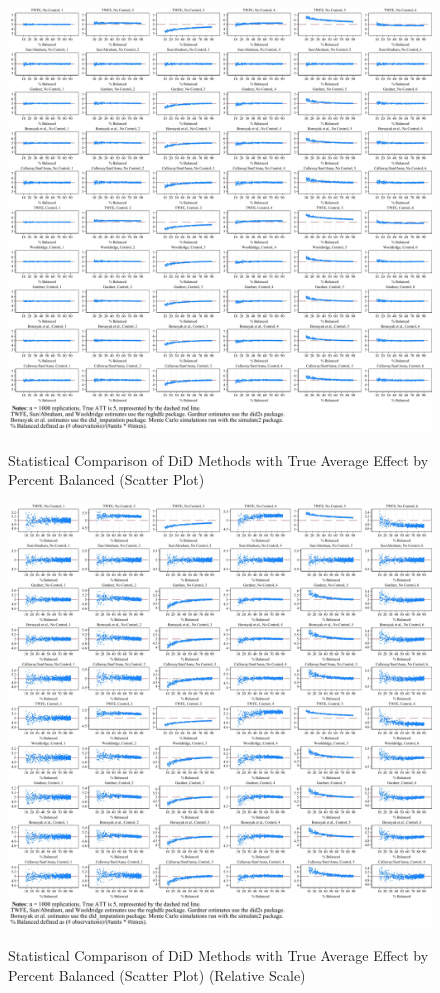 \documentclass[12pt]{article}
\begin{document}
\begin{figure}
    \centering
    \caption{Statistical Comparison of DiD Methods with True Average Effect by Percent Balanced (Scatter Plot)}
    \includegraphics[width=6in]{Figures/Scatters by Percent Balanced Common Scale.jpg}
    \label{fig:scatters-common}
\end{figure}

\begin{figure}
    \centering
    \caption{Statistical Comparison of DiD Methods with True Average Effect by Percent Balanced (Scatter Plot) (Relative Scale)}
    \includegraphics[width=6in]{Figures/Scatters by Percent Balanced Relative Scale.jpg}
    \label{fig:scatters-relative}
\end{figure}
\end{document}
